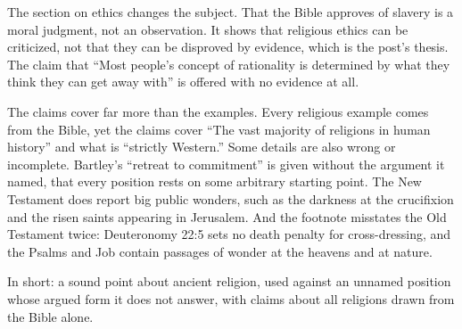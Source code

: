 \begin{afterword}
The section on ethics changes the subject. That the Bible approves of slavery is a moral judgment, not an observation. It shows that religious ethics can be criticized, not that they can be disproved by evidence, which is the post's thesis. The claim that ``Most people's concept of rationality is determined by what they think they can get away with'' is offered with no evidence at all.

The claims cover far more than the examples. Every religious example comes from the Bible, yet the claims cover ``The vast majority of religions in human history'' and what is ``strictly Western.'' Some details are also wrong or incomplete. Bartley's ``retreat to commitment'' is given without the argument it named, that every position rests on some arbitrary starting point. The New Testament does report big public wonders, such as the darkness at the crucifixion and the risen saints appearing in Jerusalem. And the footnote misstates the Old Testament twice: Deuteronomy 22:5 sets no death penalty for cross-dressing, and the Psalms and Job contain passages of wonder at the heavens and at nature.

In short: a sound point about ancient religion, used against an unnamed position whose argued form it does not answer, with claims about all religions drawn from the Bible alone.
\end{afterword}
